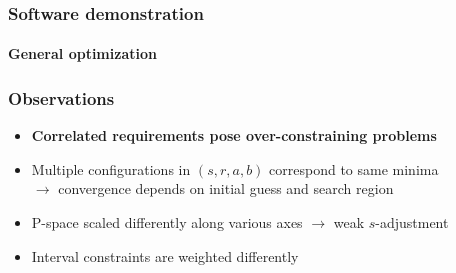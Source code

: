 \documentclass[10pt]{beamer}
\newcommand{\rarrow}{$\rightarrow$ }
\newcommand{\rfn}{\setcounter{footnote}{0}}
\begin{document}
\begin{frame}
  \rfn
  \frametitle{Software demonstration}

  \framesubtitle{General optimization}
  \vspace{-1cm}
  \begin{figure}
    \hspace{-0.5cm}
    \hspace{0.5cm}

  \end{figure}
\end{frame}

\begin{frame}
  \rfn
  \frametitle{Observations}
  \begin{itemize}
    \item \textbf{Correlated requirements pose over-constraining problems}
    \vspace{0.5cm}
    \item Multiple configurations in $(s, r, a, b)$ correspond to same minima\\
      \rarrow convergence depends on initial guess and search region
    \vspace{0.5cm}
    \item P-space scaled differently along various axes \rarrow weak $s$-adjustment
    \vspace{0.5cm}
    \item Interval constraints are weighted differently
  \end{itemize}
\end{frame}
\end{document}
